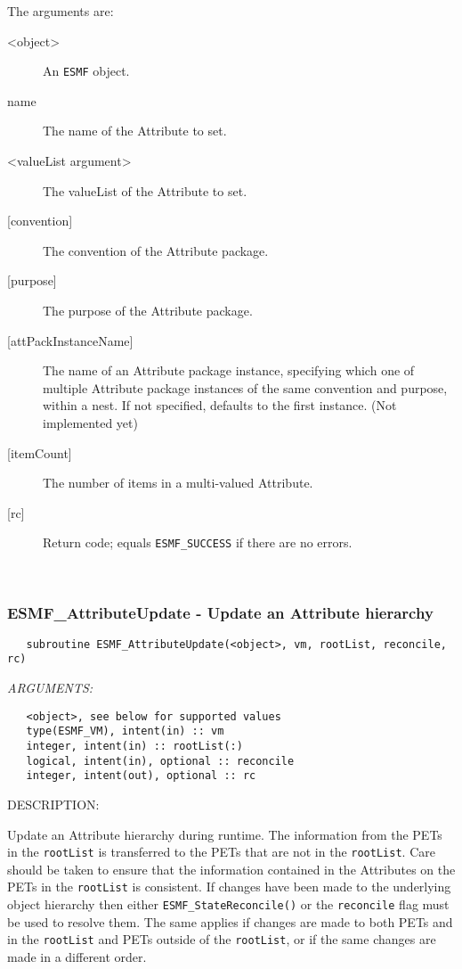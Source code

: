    The arguments are:
   \begin{description}
   \item [<object>]
   An {\tt ESMF} object.
   \item [name]
   The name of the Attribute to set.
   \item [<valueList argument>]
   The valueList of the Attribute to set.
   \item [{[convention]}]
   The convention of the Attribute package.
   \item [{[purpose]}]
   The purpose of the Attribute package.
   \item [{[attPackInstanceName]}]
   The name of an Attribute package instance, specifying which one
   of multiple Attribute package instances of the same convention
   and purpose, within a nest. If not specified, defaults to the
   first instance. (Not implemented yet)
   \item [{[itemCount]}]
   The number of items in a multi-valued Attribute.
   \item [{[rc]}]
   Return code; equals {\tt ESMF\_SUCCESS} if there are no errors.
   \end{description}
  
   
 
\mbox{}\hrulefill\ 
 
\subsubsection [ESMF\_AttributeUpdate] {ESMF\_AttributeUpdate - Update an Attribute hierarchy}


  
\begin{verbatim}   subroutine ESMF_AttributeUpdate(<object>, vm, rootList, reconcile, rc)\end{verbatim}{\em ARGUMENTS:}
\begin{verbatim}   <object>, see below for supported values
   type(ESMF_VM), intent(in) :: vm
   integer, intent(in) :: rootList(:)
   logical, intent(in), optional :: reconcile
   integer, intent(out), optional :: rc\end{verbatim}
{\sf DESCRIPTION:\\ }


   Update an Attribute hierarchy during runtime. The information from
   the PETs in the {\tt rootList} is transferred to the PETs that are not
   in the {\tt rootList}. Care should be taken to ensure that the
   information contained in the Attributes on the PETs in the {\tt rootList}
   is consistent.
   If changes have been made to the underlying object hierarchy then either
   {\tt ESMF\_StateReconcile()} or the {\tt reconcile} flag must be used to
   resolve them. The same applies if changes are made to both PETs and in
   the {\tt rootList} and PETs outside of the {\tt rootList}, or if the same
   changes are made in a different order.
  
